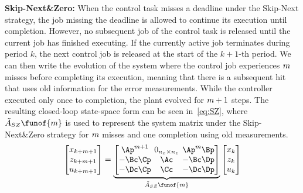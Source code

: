 \textbf{Skip-Next\&Zero: }%
%
When the control task misses a deadline under the Skip-Next strategy, the job missing the deadline is allowed to continue its execution until completion.
However, no subsequent job of the control task is released until the current job has finished executing.
If the currently active job terminates during period $k$, the next control job is released at the start of the $k+1$-th period.
We can then write the evolution of the system where the control job experiences $m$ misses before completing its execution, meaning that there is a subsequent hit that uses old information for the error measurements.
While the controller executed only once to completion, the plant evolved for $m+1$ steps.
The resulting closed-loop state-space form can be seen in~\eqref{eq:SZ}, where $\tilde A_{SZ}\funof{\nummisses}$ is used to represent the system matrix under the Skip-Next\&Zero strategy for $m$ misses and one completion using old measurements.
%
\begin{equation}
\setlength\arraycolsep{2pt}
\label{eq:SZ}
    \begin{bmatrix}
        x_{k+\nummisses+1} \\
        z_{k+\nummisses+1} \\
        u_{k+\nummisses+1}
    \end{bmatrix} = 
    \underbrace{\begin{bmatrix}
        \Ap^{\nummisses+1}  & 0_{n_x \times n_z}  & \Ap^\nummisses \Bp \\
        -\Bc\Cp             & \Ac                                       & -\Bc\Dp \\
        -\Dc\Cp             & \Cc                                       & -\Dc\Dp
    \end{bmatrix}}_{\tilde A_{SZ}\funof{\nummisses}}
    \begin{bmatrix}
        x_{k} \\
        z_{k} \\
        u_{k}
    \end{bmatrix}
\end{equation}

